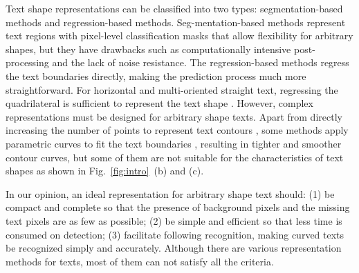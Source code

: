 \documentclass[sigconf]{acmart}
\begin{document}
	Text shape representations can be classified into two types: segmentation-based methods and regression-based methods. Seg-mentation-based methods \cite{lyu2018masktextspotter,wang2019PSENet,qin2019towards,liao2020db} represent text regions with pixel-level classification masks that allow flexibility for arbitrary shapes, but they have drawbacks such as computationally intensive post-processing and the lack of noise resistance. The regression-based methods regress the text boundaries directly, making the prediction process much more straightforward. For horizontal and multi-oriented straight text, regressing the quadrilateral is sufficient to represent the text shape   \cite{zhou2017east, li2017towards,liao2018textboxes++, liu2018FOTS, he2018end, he2021most}. However, complex representations must be designed for arbitrary shape texts. Apart from directly increasing the number of points to represent text contours   \cite{wang2019ATRR, wang2019boundary,dai2021progressive, zhang2021adaptive}, some methods apply parametric curves to fit the text boundaries   \cite{Liu2020ABCNet,  Wang2020textray, zhu2021fourier,abcnetv2, gyh1},  resulting in tighter and smoother contour curves, but some of them are not suitable for the
	characteristics of text shapes as shown in Fig.~\ref{fig:intro}~(b) and (c).
	
	In our opinion, an ideal representation for arbitrary shape text should: (1) be compact and complete so that the presence of background pixels and the missing text pixels are as few as possible; 
	(2) be simple and efficient so that less time is consumed on detection;
	(3) facilitate following recognition, making curved texts be recognized simply and accurately.
	Although there are various representation methods for texts, most of them can not satisfy all the criteria. 
	
\end{document}
